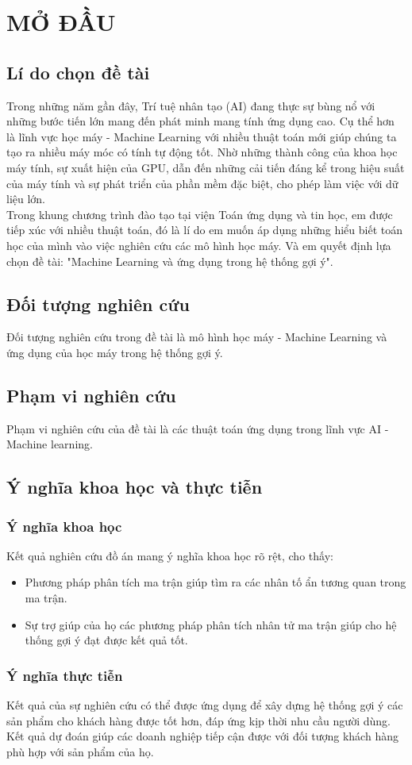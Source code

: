 \chapter{MỞ ĐẦU}
\section{Lí do chọn đề tài}
Trong những năm gần đây, Trí tuệ nhân tạo (AI) đang thực sự bùng nổ với những bước tiến lớn mang đến phát minh mang tính ứng dụng cao. Cụ thể hơn là lĩnh vực học máy - Machine Learning với nhiều thuật toán mới giúp chúng ta tạo ra nhiều máy móc có tính tự động tốt. Nhờ những thành công của khoa học máy tính, sự xuất hiện của GPU, dẫn đến những cải tiến đáng kể trong hiệu suất của máy tính và sự phát triển của phần mềm đặc biệt, cho phép làm việc với dữ liệu lớn.\\
Trong khung chương trình đào tạo tại viện Toán ứng dụng và tin học, em được tiếp xúc với nhiều thuật toán, đó là lí do em muốn áp dụng những hiểu biết toán học của mình vào việc nghiên cứu các mô hình học máy.
Và em quyết định lựa chọn đề tài: "Machine Learning và ứng dụng trong hệ thống gợi ý". 
\section{Đối tượng nghiên cứu}
Đối tượng nghiên cứu trong đề tài là mô hình học máy - Machine Learning và ứng dụng của học máy trong hệ thống gợi ý.
\section{Phạm vi nghiên cứu}
Phạm vi nghiên cứu của đề tài là các thuật toán ứng dụng trong lĩnh vực AI - Machine learning.
\section{Ý nghĩa khoa học và thực tiễn}
\subsection{Ý nghĩa khoa học}
Kết quả nghiên cứu đồ án mang ý nghĩa khoa học rõ rệt, cho thấy:
\begin{itemize}
    \item Phương pháp phân tích ma trận giúp tìm ra các nhân tố ẩn tương quan trong ma trận.
    \item Sự trợ giúp của họ các phương pháp phân tích nhân tử ma trận giúp cho hệ thống gợi ý đạt được kết quả tốt.
\end{itemize}
\subsection{Ý nghĩa thực tiễn}
Kết quả của sự nghiên cứu có thể được ứng dụng để xây dựng hệ thống gợi ý các sản phẩm cho khách hàng được tốt hơn, đáp ứng kịp thời nhu cầu người dùng. Kết quả dự đoán giúp các doanh nghiệp tiếp cận được với đối tượng khách hàng phù hợp với sản phẩm của họ.
\newpage